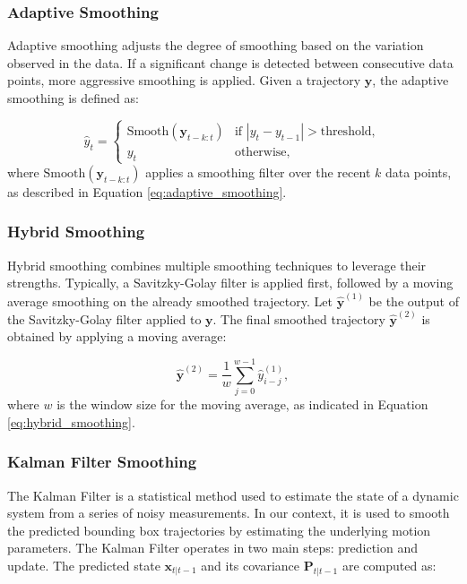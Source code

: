 \documentclass[12pt,oneside]{book} %
\begin{document}
\subsubsection*{Adaptive Smoothing}
\noindent Adaptive smoothing adjusts the degree of smoothing based on the variation observed in the data. If a significant change is detected between consecutive data points, more aggressive smoothing is applied. Given a trajectory $\mathbf{y}$, the adaptive smoothing is defined as:

\begin{equation}
    \hat{y}_t = 
    \begin{cases} 
        \text{Smooth}(\mathbf{y}_{t-k:t}) & \text{if } |y_t - y_{t-1}| > \text{threshold}, \\ 
        y_t                               & \text{otherwise},
    \end{cases} \label{eq:adaptive_smoothing}
\end{equation}
where $\text{Smooth}(\mathbf{y}_{t-k:t})$ applies a smoothing filter over the recent $k$ data points, as described in Equation \eqref{eq:adaptive_smoothing}.

\subsubsection*{Hybrid Smoothing}
\noindent Hybrid smoothing combines multiple smoothing techniques to leverage their strengths. Typically, a Savitzky-Golay filter is applied first, followed by a moving average smoothing on the already smoothed trajectory. Let $\hat{\mathbf{y}}^{(1)}$ be the output of the Savitzky-Golay filter applied to $\mathbf{y}$. The final smoothed trajectory $\hat{\mathbf{y}}^{(2)}$ is obtained by applying a moving average:

\begin{equation}
    \hat{\mathbf{y}}^{(2)} = \frac{1}{w} \sum_{j=0}^{w-1} \hat{y}^{(1)}_{i-j}, \label{eq:hybrid_smoothing}
\end{equation}
where $w$ is the window size for the moving average, as indicated in Equation \eqref{eq:hybrid_smoothing}.

\subsubsection*{Kalman Filter Smoothing}
\noindent The Kalman Filter is a statistical method used to estimate the state of a dynamic system from a series of noisy measurements. In our context, it is used to smooth the predicted bounding box trajectories by estimating the underlying motion parameters. The Kalman Filter operates in two main steps: prediction and update. The predicted state $\mathbf{x}_{t|t-1}$ and its covariance $\mathbf{P}_{t|t-1}$ are computed as:
\end{document}
